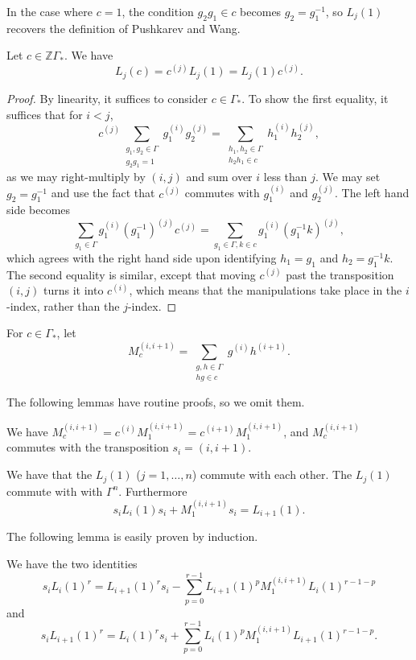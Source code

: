 \documentclass[ALCO,Unicode]{cedram}
\begin{document}
In the case where $c = 1$, the condition $g_2g_1 \in c$ becomes $g_2 = g_1^{-1}$, so $L_j(1)$ recovers the definition of Pushkarev and Wang.
\begin{proposition}
Let $c \in \mathbb{Z}\Gamma_*$. We have
\[
L_j(c) = c^{(j)} L_j(1) = L_j(1) c^{(j)}.
\]
\end{proposition}
\begin{proof}
By linearity, it suffices to consider $c \in \Gamma_*$. To show the first equality, it suffices that for $i<j$,
\[
c^{(j)} \sum_{\substack{g_1, g_2 \in \Gamma \\ g_2g_1 = 1}} g_1^{(i)} g_2^{(j)} = \sum_{\substack{h_1, h_2 \in \Gamma \\ h_2h_1 \in c}} h_1^{(i)} h_2^{(j)},
\]
as we may right-multiply by $(i,j)$ and sum over $i$ less than $j$. We may set $g_2 = g_1^{-1}$ and use the fact that $c^{(j)}$ commutes with $g_1^{(i)}$ and $g_2^{(j)}$. The left hand side becomes
\[
\sum_{g_1 \in \Gamma} g_1^{(i)} (g_1^{-1})^{(j)} c^{(j)} = \sum_{g_1 \in \Gamma, k \in c} g_1^{(i)} (g_1^{-1} k)^{(j)},
\]
which agrees with the right hand side upon identifying $h_1 = g_1$ and $h_2 = g_1^{-1}k$. The second equality is similar, except that moving $c^{(j)}$ past the transposition $(i, j)$ turns it into $c^{(i)}$, which means that the manipulations take place in the $i$-index, rather than the $j$-index.
\end{proof}



\begin{definition}
For $c \in \Gamma_*$, let
\[
M_c^{(i,i+1)} = \sum_{\substack{g,h \in \Gamma \\ hg \in c}} g^{(i)}h^{(i+1)}.
\]
\end{definition}


The following lemmas have routine proofs, so we omit them.
\begin{lemma}
We have $M_c^{(i,i+1)} = c^{(i)} M_1^{(i,i+1)}  = c^{(i+1)} M_1^{(i,i+1)}$, and $M_c^{(i,i+1)}$ commutes with the transposition $s_i = (i, i+1)$.
\end{lemma}

\begin{lemma}
We have that the $L_j(1)$ \textup{(}$j=1,\ldots,n$\textup{)} commute with each other. 
The $L_j(1)$ commute with with $\Gamma^n$. Furthermore
\[
s_i L_i(1) s_i + M_1^{(i,i+1)} s_i = L_{i+1}(1).
\]
\end{lemma}

The following lemma is easily proven by induction.
\begin{lemma} \label{iterative_swap_lemma}
We have the two identities
\[
s_i L_i(1)^r = L_{i+1}(1)^r s_i - \sum_{p=0}^{r-1} L_{i+1}(1)^p M_1^{(i,i+1)} L_i(1)^{r-1-p}
\]
and
\[
s_i L_{i+1}(1)^r = L_{i}(1)^r s_i + \sum_{p=0}^{r-1} L_{i}(1)^p M_1^{(i,i+1)} L_{i+1}(1)^{r-1-p}.
\]
\end{lemma}
\end{document}
